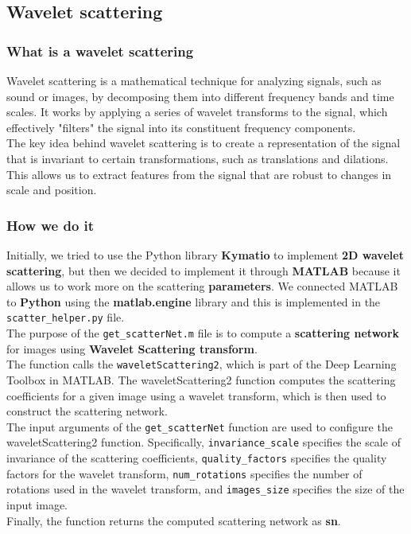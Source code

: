 \documentclass{report}
\begin{document}
\subsection{Wavelet scattering}
\subsubsection{What is a wavelet scattering}
Wavelet scattering is a mathematical technique for analyzing signals, such as sound or images, by decomposing them into different frequency bands and time scales. It works by applying a series of wavelet transforms to the signal, which effectively "filters" the signal into its constituent frequency components.\\
The key idea behind wavelet scattering is to create a representation of the signal that is invariant to certain transformations, such as translations and dilations. This allows us to extract features from the signal that are robust to changes in scale and position.
\subsubsection{How we do it}
Initially, we tried to use the Python library \textbf{Kymatio} to implement \textbf{2D wavelet scattering}, but then we decided to implement it through \textbf{MATLAB} because it allows us to work more on the scattering \textbf{parameters}. We connected MATLAB to \textbf{Python} using the \textbf{matlab.engine} library and this is implemented in the \texttt{scatter\_helper.py} file.\\

The purpose of the \texttt{get\_scatterNet.m} file is to compute a \textbf{scattering network} for images using  \textbf{Wavelet Scattering transform}.
\\The function calls the \texttt{waveletScattering2}, which is part of the Deep Learning Toolbox in MATLAB. The waveletScattering2 function computes the scattering coefficients for a given image using a wavelet transform, which is then used to construct the scattering network. \\
The input arguments of the \texttt{get\_scatterNet} function are used to configure the waveletScattering2 function. Specifically, \texttt{invariance\_scale} specifies the scale of invariance of the scattering coefficients, \texttt{quality\_factors} specifies the quality factors for the wavelet transform, \texttt{num\_rotations} specifies the number of rotations used in the wavelet transform, and \texttt{images\_size} specifies the size of the input image.\\
Finally, the function returns the computed scattering network as \textbf{sn}.\\
\end{document}
